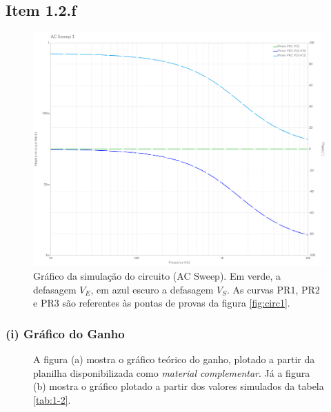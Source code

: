 \documentclass[11pt]{article}
\begin{document}
\pagebreak

\subsection*{Item 1.2.f}

\begin{figure}[h!]
  \centering
  \includegraphics[width=.5\textwidth]{fig/1f_fase_sim}
  \caption{Gráfico da simulação do circuito (AC Sweep). Em verde, a defasagem $V_{E}$, em azul escuro a defasagem $V_{S}$. As curvas PR1, PR2 e PR3 são referentes às pontas de provas da figura \ref{fig:circ1}.}
\end{figure}

\subsubsection*{(i) Gráfico do Ganho}

\begin{figure}[h!]
  \centering
  \qquad
  \caption{A figura (a) mostra o gráfico teórico do ganho, plotado a partir da planilha disponibilizada como \emph{material complementar}. Já a figura (b) mostra o gráfico plotado a partir dos valores simulados da tabela \ref{tab:1-2}.}
\end{figure}
\end{document}
